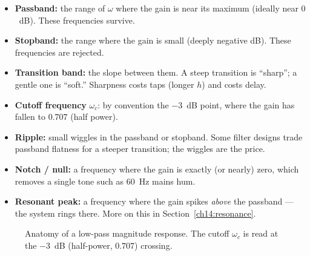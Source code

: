 \begin{itemize}
  \item \textbf{Passband:} the range of $\omega$ where the gain is near its
  maximum (ideally near $0$~dB). These frequencies survive.
  \item \textbf{Stopband:} the range where the gain is small (deeply negative
  dB). These frequencies are rejected.
  \item \textbf{Transition band:} the slope between them. A steep transition is
  ``sharp''; a gentle one is ``soft.'' Sharpness costs taps (longer $h$) and
  costs delay.
  \item \textbf{Cutoff frequency} $\omega_c$: by convention the $-3$~dB point,
  where the gain has fallen to $0.707$ (half power).
  \item \textbf{Ripple:} small wiggles in the passband or stopband. Some filter
  designs trade passband flatness for a steeper transition; the wiggles are the
  price.
  \item \textbf{Notch / null:} a frequency where the gain is exactly (or nearly)
  zero, which removes a single tone such as 60~Hz mains hum.
  \item \textbf{Resonant peak:} a frequency where the gain spikes \emph{above}
  the passband --- the system rings there. More on this in
  Section~\ref{ch14:resonance}.
\end{itemize}

\begin{figure}[H]
\centering
{}
\caption{Anatomy of a low-pass magnitude response. The cutoff $\omega_c$ is read
at the $-3$~dB (half-power, $0.707$) crossing.}
\label{ch14:fig-anatomy}
\end{figure}

